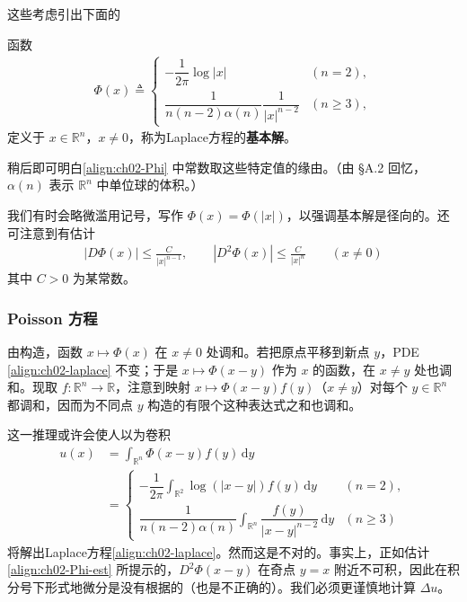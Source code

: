 \documentclass[../../main.tex]{subfiles}
\begin{document}
这些考虑引出下面的

\begin{definition}\label{definition:ch02-fundamental-solution}
函数
\begin{align}\label{align:ch02-Phi}
\Phi(x)\triangleq
\begin{cases}
-\dfrac{1}{2\pi}\log|x| & (n=2),\\
\dfrac{1}{n(n-2)\alpha(n)}\dfrac{1}{|x|^{n-2}} & (n\geqslant 3),
\end{cases}
\end{align}
定义于 $x\in\mathbb{R}^n$，$x\neq 0$，称为Laplace方程的\textbf{基本解}。
\end{definition}

稍后即可明白\eqref{align:ch02-Phi} 中常数取这些特定值的缘由。（由 \S A.2 回忆，$\alpha(n)$ 表示 $\mathbb{R}^n$ 中单位球的体积。）

我们有时会略微滥用记号，写作 $\Phi(x)=\Phi(|x|)$，以强调基本解是径向的。还可注意到有估计
\begin{align}\label{align:ch02-Phi-est}
|D\Phi(x)|\leqslant\frac{C}{|x|^{n-1}},\qquad |D^2\Phi(x)|\leqslant\frac{C}{|x|^n} \qquad (x\neq 0)
\end{align}
其中 $C>0$ 为某常数。

\subsubsection{Poisson 方程}

由构造，函数 $x\mapsto\Phi(x)$ 在 $x\neq 0$ 处调和。若把原点平移到新点 $y$，PDE \eqref{align:ch02-laplace} 不变；于是 $x\mapsto\Phi(x-y)$ 作为 $x$ 的函数，在 $x\neq y$ 处也调和。现取 $f:\mathbb{R}^n\to\mathbb{R}$，注意到映射 $x\mapsto\Phi(x-y)f(y)$（$x\neq y$）对每个 $y\in\mathbb{R}^n$ 都调和，因而为不同点 $y$ 构造的有限个这种表达式之和也调和。

这一推理或许会使人以为卷积
\begin{align}\label{align:ch02-newton-potential}
u(x)&=\int_{\mathbb{R}^n}\Phi(x-y)f(y)\,\mathrm{d}y\\
&=\begin{cases}
-\dfrac{1}{2\pi}\int_{\mathbb{R}^2}\log(|x-y|)f(y)\,\mathrm{d}y & (n=2),\\
\dfrac{1}{n(n-2)\alpha(n)}\displaystyle\int_{\mathbb{R}^n}\dfrac{f(y)}{|x-y|^{n-2}}\,\mathrm{d}y & (n\geqslant 3)
\end{cases}\nonumber
\end{align}
将解出Laplace方程\eqref{align:ch02-laplace}。然而这是不对的。事实上，正如估计\eqref{align:ch02-Phi-est} 所提示的，$D^2\Phi(x-y)$ 在奇点 $y=x$ 附近不可积，因此在积分号下形式地微分是没有根据的（也是不正确的）。我们必须更谨慎地计算 $\Delta u$。
\end{document}
